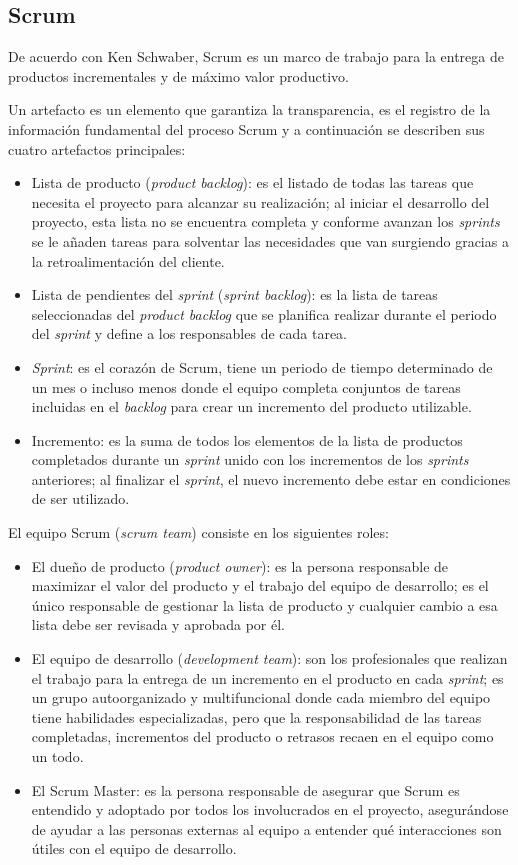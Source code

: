 \subsection{Scrum}

De acuerdo con Ken Schwaber\cite{guide_definitive_2020}, Scrum es un marco de trabajo para la entrega de productos incrementales y de máximo valor productivo.

Un artefacto es un elemento que garantiza la transparencia, es el registro de la información fundamental del proceso Scrum y a continuación se describen sus cuatro artefactos principales:

\begin{itemize}
	\item Lista de producto (\textit{product backlog}):	es el listado de todas las tareas que necesita el proyecto para alcanzar su realización; al iniciar el desarrollo del proyecto, esta lista no se encuentra completa y conforme avanzan los \textit{sprints} se le añaden tareas para solventar las necesidades que van surgiendo gracias a la retroalimentación del cliente.
	\item Lista de pendientes del \textit{sprint} (\textit{sprint backlog}): es la lista de tareas seleccionadas del \textit{product backlog} que se planifica realizar durante el periodo del \textit{sprint} y define a los responsables de cada tarea.
	\item \textit{Sprint}: es el corazón de Scrum, tiene un periodo de tiempo determinado de un mes o incluso menos donde el equipo completa conjuntos de tareas incluidas en el \textit{backlog} para crear un incremento del producto utilizable.
	\item Incremento: es la suma de todos los elementos de la lista de productos completados durante un \textit{sprint} unido con los incrementos de los \textit{sprints} anteriores; al finalizar el \textit{sprint}, el nuevo incremento debe estar en condiciones de ser utilizado.
\end{itemize}

El equipo Scrum (\textit{scrum team}) consiste en los siguientes roles:
\begin{itemize}
	\item El dueño de producto (\textit{product owner}): es la persona responsable de maximizar el valor del producto y el trabajo del equipo de desarrollo; es el único responsable de gestionar la lista de producto y cualquier cambio a esa lista debe ser revisada y aprobada por él.
	\item El equipo de desarrollo (\textit{development team}): son los profesionales que realizan el trabajo para la entrega de un incremento en el producto en cada \textit{sprint}; es un grupo autoorganizado y multifuncional donde cada miembro del equipo tiene habilidades especializadas, pero que la responsabilidad de las tareas completadas, incrementos del producto o retrasos recaen en el equipo como un todo.
	\item  El Scrum Master: es la persona responsable de asegurar que Scrum es entendido y adoptado por todos los involucrados en el proyecto, asegurándose de ayudar a las personas externas al equipo a entender qué interacciones son útiles con el equipo de desarrollo.
\end{itemize}


